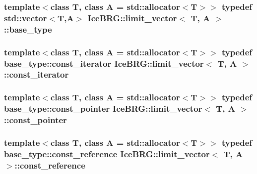 \subsubsection[{base\+\_\+type}]{\setlength{\rightskip}{0pt plus 5cm}template$<$class T, class A = std\+::allocator$<$\+T$>$$>$ typedef std\+::vector$<$T,A$>$ {\bf Ice\+B\+R\+G\+::limit\+\_\+vector}$<$ T, A $>$\+::{\bf base\+\_\+type}}\label{classIceBRG_1_1limit__vector_a8f5c1d622276ed2d9835feab9538b96e}
\hypertarget{classIceBRG_1_1limit__vector_ae7acd983de8fc074624eb50450a01e30}{}
\subsubsection[{const\+\_\+iterator}]{\setlength{\rightskip}{0pt plus 5cm}template$<$class T, class A = std\+::allocator$<$\+T$>$$>$ typedef base\+\_\+type\+::const\+\_\+iterator {\bf Ice\+B\+R\+G\+::limit\+\_\+vector}$<$ T, A $>$\+::{\bf const\+\_\+iterator}}\label{classIceBRG_1_1limit__vector_ae7acd983de8fc074624eb50450a01e30}
\hypertarget{classIceBRG_1_1limit__vector_a06b68c790b5e5692b6e302d5478be33f}{}
\subsubsection[{const\+\_\+pointer}]{\setlength{\rightskip}{0pt plus 5cm}template$<$class T, class A = std\+::allocator$<$\+T$>$$>$ typedef base\+\_\+type\+::const\+\_\+pointer {\bf Ice\+B\+R\+G\+::limit\+\_\+vector}$<$ T, A $>$\+::{\bf const\+\_\+pointer}}\label{classIceBRG_1_1limit__vector_a06b68c790b5e5692b6e302d5478be33f}
\hypertarget{classIceBRG_1_1limit__vector_aed6fc504d7987040be16d150089c7893}{}
\subsubsection[{const\+\_\+reference}]{\setlength{\rightskip}{0pt plus 5cm}template$<$class T, class A = std\+::allocator$<$\+T$>$$>$ typedef base\+\_\+type\+::const\+\_\+reference {\bf Ice\+B\+R\+G\+::limit\+\_\+vector}$<$ T, A $>$\+::{\bf const\+\_\+reference}}\label{classIceBRG_1_1limit__vector_aed6fc504d7987040be16d150089c7893}
\hypertarget{classIceBRG_1_1limit__vector_a4feb81d3ff27e274df451f2fe85cd21a}{}
